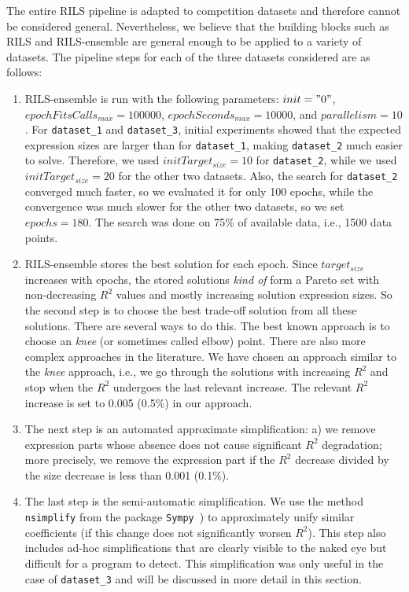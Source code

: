 \documentclass{article}
\begin{document}
The entire RILS pipeline is adapted to competition datasets and therefore cannot be considered general. Nevertheless, we believe that the building blocks such as RILS and RILS-ensemble are general enough to be applied to a variety of datasets. The pipeline steps for each of the three datasets considered are as follows:
\begin{enumerate}
    \item RILS-ensemble is run with the following parameters: $init="0"$, $epochFitsCalls_{max}=100000$, $epochSeconds_{max}=10000$, and $parallelism=10$. For \texttt{dataset\_1} and \texttt{dataset\_3}, initial experiments showed that the expected expression sizes are larger than for \texttt{dataset\_1}, making \texttt{dataset\_2} much easier to solve. Therefore, we used $initTarget_{size}=10$ for \texttt{dataset\_2}, while we used $initTarget_{size}=20$ for the other two datasets. Also, the search for \texttt{dataset\_2} converged much faster, so we evaluated it for only 100 epochs, while the convergence was much slower for the other two datasets, so we set $epochs=180$. The search was done on 75\% of available data, i.e., 1500 data points. 
    \item RILS-ensemble stores the best solution for each epoch. Since $target_{size}$ increases with epochs, the stored solutions \emph{kind of} form a Pareto set with non-decreasing $R^2$ values and mostly increasing solution expression sizes. So the second step is to choose the best trade-off solution from all these solutions. There are several ways to do this. The best known approach is to choose an \emph{knee} (or sometimes called elbow) point. There are also more complex approaches in the literature. We have chosen an approach similar to the \emph{knee} approach, i.e., we go through the solutions with increasing $R^2$ and stop when the $R^2$ undergoes the last relevant increase. The relevant $R^2$ increase is set to 0.005 (0.5\%) in our approach. 
    \item The next step is an automated approximate simplification: a) we remove expression parts whose absence does not cause significant $R^2$ degradation; more precisely, we remove the expression part if the $R^2$ decrease divided by the size decrease is less than 0.001 (0.1\%). 
    \item The last step is the semi-automatic simplification. We use the method \texttt{nsimplify} from the package \texttt{Sympy}~\cite{sympy}) to approximately unify similar coefficients (if this change does not significantly worsen $R^2$). This step also includes ad-hoc simplifications that are clearly visible to the naked eye but difficult for a program to detect. This simplification was only useful in the case of \texttt{dataset\_3} and will be discussed in more detail in this section.
\end{enumerate}
\end{document}
